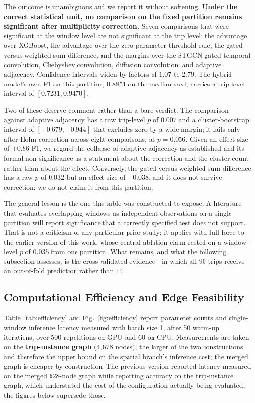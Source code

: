 \documentclass[journal]{IEEEtran}
\begin{document}
The outcome is unambiguous and we report it without softening. \textbf{Under the correct statistical unit, no comparison on the fixed partition remains significant after multiplicity correction.} Seven comparisons that were significant at the window level are not significant at the trip level: the advantage over XGBoost, the advantage over the zero-parameter threshold rule, the gated-versus-weighted-sum difference, and the margins over the STGCN gated temporal convolution, Chebyshev convolution, diffusion convolution, and adaptive adjacency. Confidence intervals widen by factors of $1.07$ to $2.79$. The hybrid model's own F1 on this partition, $0.8851$ on the median seed, carries a trip-level interval of $[0.7231, 0.9470]$.

Two of these deserve comment rather than a bare verdict. The comparison against adaptive adjacency has a raw trip-level $p$ of $0.007$ and a cluster-bootstrap interval of $[+0.679, +0.944]$ that excludes zero by a wide margin; it fails only after Holm correction across eight comparisons, at $p = 0.056$. Given an effect size of $+0.86$ F1, we regard the collapse of adaptive adjacency as established and its formal non-significance as a statement about the correction and the cluster count rather than about the effect. Conversely, the gated-versus-weighted-sum difference has a raw $p$ of $0.032$ but an effect size of $-0.038$, and it does not survive correction; we do not claim it from this partition.

The general lesson is the one this table was constructed to expose. A literature that evaluates overlapping windows as independent observations on a single partition will report significance that a correctly specified test does not support. That is not a criticism of any particular prior study; it applies with full force to the earlier version of this work, whose central ablation claim rested on a window-level $p$ of $0.035$ from one partition. What remains, and what the following subsection assesses, is the cross-validated evidence---in which all $90$ trips receive an out-of-fold prediction rather than $14$.

\subsection{Computational Efficiency and Edge Feasibility}
\label{sec:efficiency}

Table~\ref{tab:efficiency} and Fig.~\ref{fig:efficiency} report parameter counts and single-window inference latency measured with batch size 1, after 50 warm-up iterations, over 500 repetitions on GPU and 60 on CPU. Measurements are taken on the \textbf{trip-instance graph} ($4{,}678$ nodes), the larger of the two constructions and therefore the upper bound on the spatial branch's inference cost; the merged graph is cheaper by construction. The previous version reported latency measured on the merged $628$-node graph while reporting accuracy on the trip-instance graph, which understated the cost of the configuration actually being evaluated; the figures below supersede those.
\end{document}
